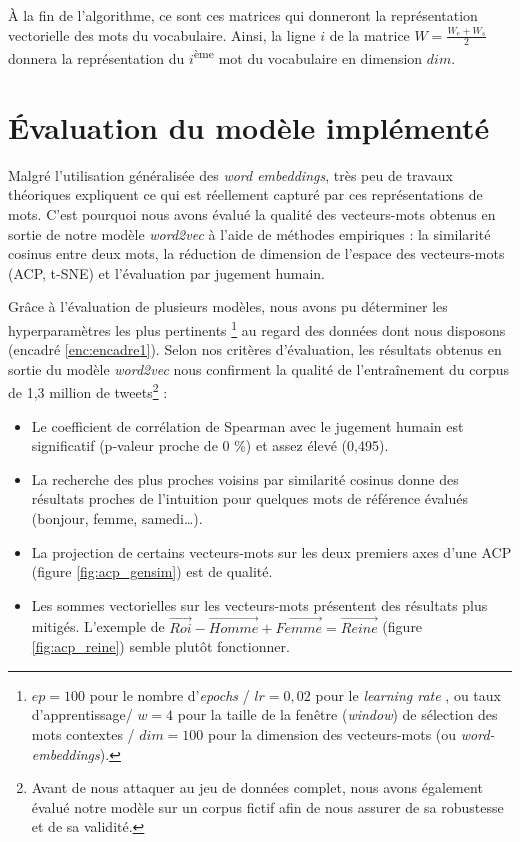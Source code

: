 \documentclass[10pt,french,french]{article}
\let\rmarkdownfootnote\footnote%
\def\footnote{\protect\rmarkdownfootnote}
\begin{document}
À la fin de l'algorithme, ce sont ces matrices qui donneront la représentation vectorielle des mots du vocabulaire.
Ainsi, la ligne \(i\) de la matrice \(W=\frac{W_e+W_s}{2}\) donnera la représentation du \(i\)\textsuperscript{ème} mot du vocabulaire en dimension \(dim\).

\newpage

\hypertarget{sec:evaluation}{%
\section{Évaluation du modèle implémenté}\label{sec:evaluation}}

Malgré l'utilisation généralisée des \emph{word embeddings}, très peu de travaux théoriques expliquent ce qui est réellement capturé par ces représentations de mots.
C'est pourquoi nous avons évalué la qualité des vecteurs-mots obtenus en sortie de notre modèle \emph{word2vec} à l'aide de méthodes empiriques : la similarité cosinus entre deux mots, la réduction de dimension de l'espace des vecteurs-mots (ACP, t-SNE) et l'évaluation par jugement humain.

Grâce à l'évaluation de plusieurs modèles, nous avons pu déterminer les hyperparamètres les plus pertinents
\footnote{
$ep = 100$ pour le nombre d'\og \emph{epochs} \fg / $lr = 0,02$ pour le \og \emph{learning rate} \fg, ou taux d'apprentissage/ $w = 4$ pour la taille de la fenêtre (\emph{window}) de sélection des mots contextes / $dim = 100$ pour la dimension des vecteurs-mots (ou \emph{word-embeddings}).
} au regard des données dont nous disposons (encadré \ref{enc:encadre1}).
Selon nos critères d'évaluation, les résultats obtenus en sortie du modèle \emph{word2vec} nous confirment la qualité de l'entraînement du corpus de 1,3 million de tweets\footnote{Avant de nous attaquer au jeu de données complet, nous avons également évalué notre modèle sur un corpus fictif afin de nous assurer de sa robustesse et de sa validité.} :

\begin{itemize}
\item Le coefficient de corrélation de Spearman avec le jugement humain est significatif (p-valeur proche de 0 \%) et assez élevé (0,495).
\item La recherche des plus proches voisins par similarité cosinus donne des résultats proches de l'intuition pour quelques mots de référence évalués (bonjour, femme, samedi\dots).
\item La projection de certains vecteurs-mots sur les deux premiers axes d'une ACP (figure \ref{fig:acp_gensim}) est de qualité.
\item Les sommes vectorielles sur les vecteurs-mots présentent des résultats plus mitigés. L'exemple de  $\overrightarrow{Roi} - \overrightarrow{Homme} + \overrightarrow{Femme} = \overrightarrow{Reine}$ (figure \ref{fig:acp_reine}) semble plutôt fonctionner. 
\end{itemize}
\end{document}
